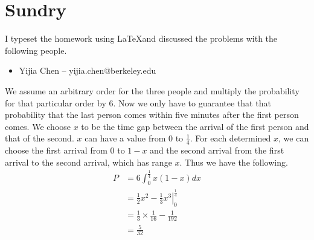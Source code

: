\documentclass[11pt]{article}
\newcommand*\Eval[3]{\left.#1\right\rvert_{#2}^{#3}}
\begin{document}
\section*{Sundry}

\begin{Answer}
    I typeset the homework using \LaTeX and discussed the problems with the following people.
    \begin{itemize}
        \item Yijia Chen -- yijia.chen@berkeley.edu
    \end{itemize}
\end{Answer}

\newpage
{}

\begin{Answer}
    We assume an arbitrary order for the three people and multiply the probability for that particular 
    order by $6$. Now we only have to guarantee that that probability that the last person comes within 
    five minutes after the first person comes. We choose $x$ to be the time gap between the arrival of 
    the first person and that of the second. $x$ can have a value from $0$ to $\frac{1}{4}$. For each 
    determined $x$, we can choose the first arrival from $0$ to $1-x$ and the second arrival from 
    the first arrival to the second arrival, which has range $x$. Thus we have the following. 
    \begin{align*}
        P &= 6\int_0^{\frac{1}{4}} x(1-x) dx \\
          &= \Eval{\frac{1}{2}x^2 - \frac{1}{3}x^3}{0}{\frac{1}{4}} \\
          &= \frac{1}{3} \times \frac{1}{16} - \frac{1}{192} \\
          &= \frac{5}{32}
    \end{align*}
\end{Answer}

\newpage
{}
\end{document}
